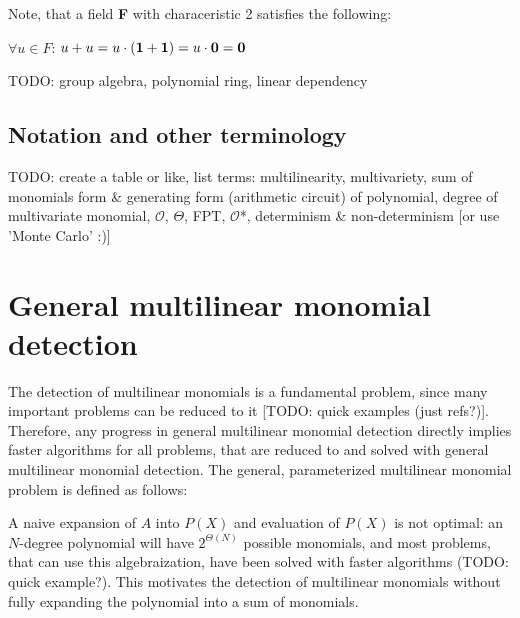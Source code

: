 Note, that a field \textbf F with characeristic 2 satisfies the following:
\begin{center}
  $\forall u \in F$: $u + u = u \cdot (\textbf 1 + \textbf 1) = u \cdot \textbf 0 = \textbf 0$
\end{center}

TODO: group algebra, polynomial ring, linear dependency

\subsection{Notation and other terminology} %

TODO: create a table or like, list terms: 
multilinearity, multivariety, sum of monomials form \& generating form (arithmetic circuit) of polynomial, 
degree of multivariate monomial, $\mathcal{O}$, $\Theta$, FPT, $\mathcal{O}$*, determinism \& non-determinism [or use 'Monte Carlo' :)]

\section{General multilinear monomial detection}

The detection of multilinear monomials is a fundamental problem, 
since many important problems can be reduced to it [TODO: quick examples (just refs?)]. 
Therefore, any progress in general multilinear monomial detection directly implies 
faster algorithms for all problems, that are reduced to and solved with general multilinear monomial detection. 
The general, parameterized multilinear monomial problem is defined as follows: 

\begin{problem}
\end{problem}

A naive expansion of $A$ into $P(X)$ and evaluation of $P(X)$ is not optimal: 
an $N$-degree polynomial will have $2^{\Theta(N)}$ possible monomials, and most 
problems, that can use this algebraization, have been solved with faster algorithms (TODO: quick example?). 
This motivates the detection of multilinear monomials without fully expanding the polynomial into a sum of monomials.\nl

